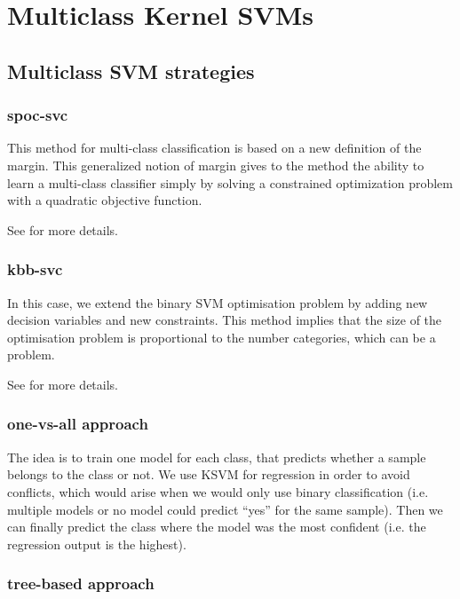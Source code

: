 
\section{Multiclass Kernel SVMs}


\subsection{Multiclass SVM strategies}

\subsubsection{spoc-svc}

This method for multi-class classification is based on a new definition of the margin. This generalized notion of margin gives to the method the ability to learn a multi-class classifier simply by solving a constrained optimization
problem with a quadratic objective function.

See \cite{spoc-svc} for more details.


\subsubsection{kbb-svc}

In this case, we extend the binary SVM optimisation problem by adding new decision variables and new constraints. This method implies that the size of the optimisation problem is proportional to the number categories, which can be a problem. 

See \cite{kbb-svc} for more details.


\subsubsection{one-vs-all approach}

The idea is to train one model for each class, that predicts whether a sample belongs to the class or not.
We use KSVM for regression in order to avoid conflicts, which would arise when we would only use binary classification
(i.e. multiple models or no model could predict ``yes'' for the same sample).
Then we can finally predict the class where the model was the most confident (i.e. the regression output is the highest).

\subsubsection{tree-based approach}




